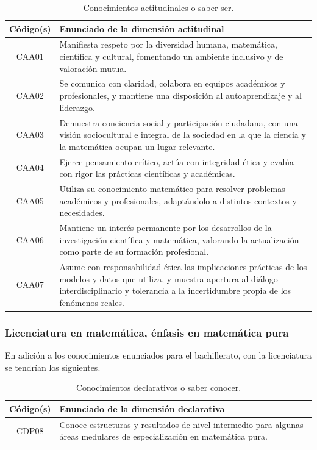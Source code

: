 \begin{table}[H]
\centering
\renewcommand{\arraystretch}{1.3}
\begin{tabular}{|c|p{9cm}|}
\hline
\cellcolor[HTML]{00C0F3}\textbf{Código(s)} & \cellcolor[HTML]{00C0F3}\textbf{Enunciado de la dimensión actitudinal} \\
\hline
CAA01 & Manifiesta respeto por la diversidad humana, matemática, científica y cultural, fomentando un ambiente inclusivo y de valoración mutua. \\
\hline
CAA02 & Se comunica con claridad, colabora en equipos académicos y profesionales, y mantiene una disposición al autoaprendizaje y al liderazgo.\\
\hline
CAA03 & Demuestra conciencia social y participación ciudadana, con una visión sociocultural e integral de la sociedad en la que la ciencia y la matemática ocupan un lugar relevante.\\
\hline
CAA04 & Ejerce pensamiento crítico, actúa con integridad ética y evalúa con rigor las prácticas científicas y académicas.\\
\hline
CAA05 & Utiliza su conocimiento matemático para resolver problemas académicos y profesionales, adaptándolo a distintos contextos y necesidades.\\
\hline
CAA06 & Mantiene un interés permanente por los desarrollos de la investigación científica y matemática, valorando la actualización como parte de su formación profesional.\\
\hline
CAA07 & Asume con responsabilidad ética las implicaciones prácticas de los modelos y datos que utiliza, y muestra apertura al diálogo interdisciplinario y tolerancia a la incertidumbre propia de los fenómenos reales.\\
\hline
\end{tabular}
\caption{Conocimientos actitudinales o saber ser.}
\label{tab:actitudinal-egreso-integrada}
\end{table}


\subsubsection{Licenciatura en matemática, énfasis en matemática pura}


En adición a los conocimientos enunciados para el bachillerato, con la licenciatura se tendrían los siguientes.

\begin{table}[H]
\centering
\renewcommand{\arraystretch}{1.3}
\begin{tabular}{|c|p{9cm}|}
\hline
\cellcolor[HTML]{00C0F3}\textbf{Código(s)} & \cellcolor[HTML]{00C0F3}\textbf{Enunciado de la dimensión declarativa} \\
\hline
CDP08 & Conoce estructuras y resultados de nivel intermedio para algunas áreas medulares de especialización en matemática pura. 
\\
\hline
\end{tabular}
\caption{Conocimientos declarativos o saber conocer.}
\label{tab:declarativa-egreso-integrada}
\end{table}


